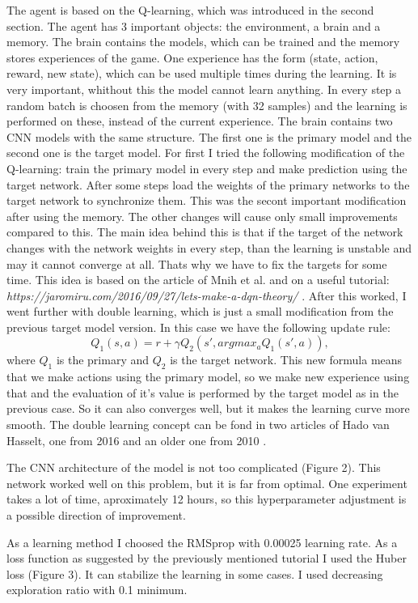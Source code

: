 \documentclass[12p]{article}
\begin{document}
    \par
    The agent is based on the Q-learning, which was introduced in the second section. The agent has 3 important objects: the environment,
    a brain and a memory. The brain contains the models, which can be trained and the memory stores experiences of the game. One
    experience has the form (state, action, reward, new state), which can be used multiple times during the learning. It is very important,
    whithout this the model cannot learn anything. In every step a random batch is choosen from the memory (with 32 samples) and the learning
    is performed on these, instead of the current experience. The brain contains two CNN models with the same structure. The first one is the primary
    model and the second one is the target model. For first I tried the following modification of the Q-learning: train the primary model in every
    step and make prediction using the target network. After some steps load the weights of the primary networks to the target network
    to synchronize them. This was the secont important modification after using the memory. The other changes will cause only small
    improvements compared to this. The main idea behind this is that if the target of the network changes with the network weights in every
    step, than the learning is unstable and may it cannot converge at all. Thats why we have to fix the targets for some time.
    This idea is based on the article of Mnih et al. \cite{2model} and on a useful
    tutorial: \textit{https://jaromiru.com/2016/09/27/lets-make-a-dqn-theory/} \cite{tutorial}. After this worked, I went
    further with double learning, which
    is just a small modification from the previous target model version. In this case we have the following update rule:
    \begin{equation}
        Q_1(s,a) = r + \gamma Q_2(s',argmax_a Q_1(s',a)),
    \end{equation}
    where $Q_1$ is the primary and $Q_2$ is the target network. This new formula means that we make actions using the primary model,
    so we make new experience using that and the evaluation of it's value is performed by the target model as in the previous case.
    So it can also converges well, but it makes the learning curve more smooth. The double learning concept can be fond in two
    articles of Hado van Hasselt, one from 2016 \cite{double1} and an older one from 2010 \cite{double2}.
    \par
    The CNN architecture of the model is not too complicated (Figure 2). This network worked well on this problem, but it is far from optimal.
    One experiment takes a lot of time, aproximately 12 hours, so this hyperparameter adjustment is a possible direction of improvement. 
    \par
    As a learning method I choosed the RMSprop with 0.00025 learning rate. As a loss function as suggested by the previously mentioned tutorial I used the
    Huber loss (Figure 3). It can stabilize the learning in some cases. I used decreasing exploration ratio with 0.1 minimum. 
\end{document}
